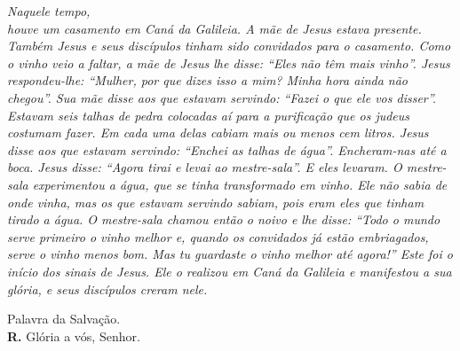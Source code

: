 \documentclass[a5paper,9pt]{memoir}
\begin{document}
{\begin{paracol}{2}
	\itshape
	Naquele tempo,\\
	houve um casamento em Can\'a da Galileia. A m\~ae de Jesus estava presente. Tamb\'em Jesus e seus disc\'ipulos tinham sido convidados para o casamento. Como o vinho veio a faltar, a m\~ae de Jesus lhe disse: ``Eles n\~ao t\^em mais vinho''. Jesus respondeu-lhe: ``Mulher, por que dizes isso a mim? Minha hora ainda n\~ao chegou''. Sua m\~ae disse aos que estavam servindo: ``Fazei o que ele vos disser''. Estavam seis talhas de pedra colocadas a\'i para a purifica\c c\~ao que os judeus costumam fazer. Em cada uma delas cabiam mais ou menos cem litros. Jesus disse aos que estavam servindo: ``Enchei as talhas de \'agua''. Encheram-nas at\'e a boca. Jesus disse: ``Agora tirai e levai ao mestre-sala''. E eles levaram. O mestre-sala experimentou a \'agua, que se tinha transformado em vinho. Ele n\~ao sabia de onde vinha, mas os que estavam servindo sabiam, pois eram eles que tinham tirado a \'agua. O mestre-sala chamou ent\~ao o noivo e lhe disse: ``Todo o mundo serve primeiro o vinho melhor e, quando os convidados j\'a est\~ao embriagados, serve o vinho menos bom. Mas tu guardaste o vinho melhor at\'e agora!'' Este foi o in\'icio dos sinais de Jesus. Ele o realizou em Can\'a da Galileia e manifestou a sua gl\'oria, e seus disc\'ipulos creram nele.
\end{paracol}
Palavra da Salva\c c\~ao.\\
\textbf{R.} Gl\'oria a v\'os, Senhor.

}
\end{document}
